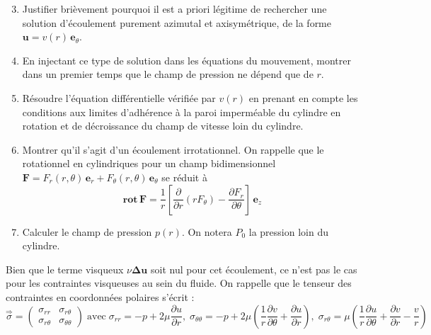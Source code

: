 \begin{enumerate}
\setcounter{enumi}{2}
\item
Justifier bri\`evement pourquoi il est a priori l\'egitime de rechercher
une solution d'\'ecoulement purement azimutal et axisym\'etrique, 
de la forme $\mathbf{u} = v(r) \, \mathbf{e}_\theta$.
\item
En injectant ce type de solution dans les \'equations du mouvement,
montrer dans un premier temps que le champ de pression ne d\'epend
que de $r$.
\item
R\'esoudre l'\'equation diff\'erentielle v\'erifi\'ee par $v(r)$
en prenant en compte les conditions aux limites d'adh\'erence \`a la paroi
imperm\'eable du cylindre en rotation et de d\'ecroissance du champ
de vitesse loin du cylindre.
\item
Montrer qu'il s'agit d'un \'ecoulement irrotationnel.
On rappelle que le rotationnel en cylindriques pour un champ bidimensionnel
$\mathbf{F} = F_r(r, \theta) \, \mathbf{e}_r + F_\theta(r, \theta) \, \mathbf{e}_\theta$
se r\'eduit \`a
\[
\textbf{rot} \, \mathbf{F} = \frac{1}{r} \left [ 
\frac{\partial}{\partial r}(rF_\theta) - \frac{\partial F_r}{\partial \theta}
\right ] \, \mathbf{e}_z
\]
\item
Calculer le champ de pression $p(r)$.
On notera $P_0$ la pression loin du cylindre.
\label{question:pression}
\end{enumerate}
\noindent
Bien que le terme visqueux $\nu \boldsymbol{\Delta} \mathbf{u}$ soit nul pour cet
\'ecoulement, ce n'est pas le cas pour les contraintes visqueuses au sein du fluide.
On rappelle que le tenseur des contraintes en coordonn\'ees polaires s'\'ecrit :
\begin{equation*}
\stackrel{\Rightarrow}{\sigma} =
\left (
\begin{array}{cc}
\sigma_{rr}      & \sigma_{r\theta} \\
\sigma_{r\theta} & \sigma_{\theta\theta}
\end{array}
\right ) 
\; \mbox{avec} \;
\sigma_{rr} = -p + 2\mu \frac{\partial u}{\partial r}, \;
\sigma_{\theta\theta} = -p + 2\mu 	\left (
	\frac{1}{r} \frac{\partial v}{\partial \theta} 
      + \frac{\partial u}{\partial r} 	\right ), \;
\sigma_{r\theta} = \mu \left (
  	\frac{1}{r} \frac{\partial u}{\partial \theta} 
      + \frac{\partial v}{\partial r}
      - \frac{v}{r}    \right )
\end{equation*}
